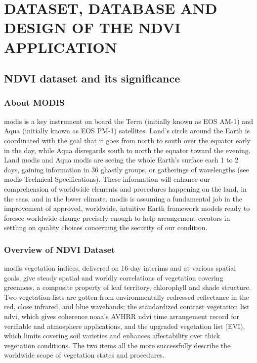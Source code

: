 \chapter{DATASET, DATABASE AND DESIGN OF THE NDVI APPLICATION}
\label{chap:argo}

\section{NDVI dataset and its significance}

\subsection{About MODIS}

\newcommand{\MYhref}[3][blue]{\href{#2}{\color{#1}{#3}}}%

\centerline{\MYhref{https://modis.gsfc.nasa.gov/}{NASA's MODIS website}}

\gls{modis} is a key instrument on board the Terra (initially known as EOS AM-1) and Aqua (initially known as EOS PM-1) satellites. Land's circle around the Earth is coordinated with the goal that it goes from north to south over the equator early in the day, while Aqua disregards south to north the equator toward the evening. Land \gls{modis} and Aqua \gls{modis} are seeing the whole Earth's surface each 1 to 2 days, gaining information in 36 ghastly groups, or gatherings of wavelengths (see \gls{modis} Technical Specifications). These information will enhance our comprehension of worldwide elements and procedures happening on the land, in the seas, and in the lower climate. \gls{modis} is assuming a fundamental job in the improvement of approved, worldwide, intuitive Earth framework models ready to foresee worldwide change precisely enough to help arrangement creators in settling on quality choices concerning the security of our condition. \\

\subsection{Overview of NDVI Dataset}

\gls{modis} vegetation indices, delivered on 16-day interims and at various spatial goals, give steady spatial and worldly correlations of vegetation covering greenness, a composite property of leaf territory, chlorophyll and shade structure. Two vegetation lists are gotten from environmentally redressed reflectance in the red, close infrared, and blue wavebands; the standardized contrast vegetation list \gls{ndvi}, which gives coherence \gls{noaa}'s AVHRR \gls{ndvi} time arrangement record for verifiable and atmosphere applications, and the upgraded vegetation list (EVI), which limits covering soil varieties and enhances affectability over thick vegetation conditions. The two items all the more successfully describe the worldwide scope of vegetation states and procedures. 


